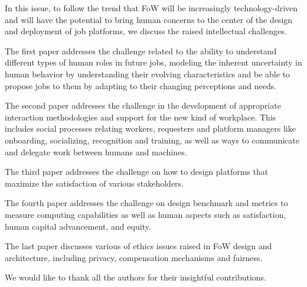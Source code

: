\documentclass[11pt]{article}
\begin{document}
In this issue, to follow the trend that FoW will be increasingly technology-driven and will have the potential to bring human concerns to the center of the design and deployment of job platforms,  we discuss the raised intellectual challenges.

The first paper addresses the challenge related to the ability to understand different types of human roles in future jobs, modeling the inherent uncertainty in human behavior by understanding their evolving characteristics and be able to propose jobs to them by adapting to their changing perceptions and needs.

The second paper addresses the challenge in the development of appropriate interaction methodologies and support for the new kind of workplace. This includes social processes relating workers, requesters and platform managers like onboarding, socializing, recognition and training, as well as ways to communicate and delegate work between humans and machines.

The third paper addresses the challenge on how to design platforms that maximize the satisfaction of various stakeholders.

The fourth paper addresses the challenge on design benchmark and metrics to measure computing capabilities as well as human aspects such as satisfaction, human capital advancement, and equity.

The last paper discusses various of ethics issues raised in FoW design and architecture, including privacy, compensation mechanisms and fairness.

We  would like to thank all the authors for their insightful contributions. 
\end{document}
